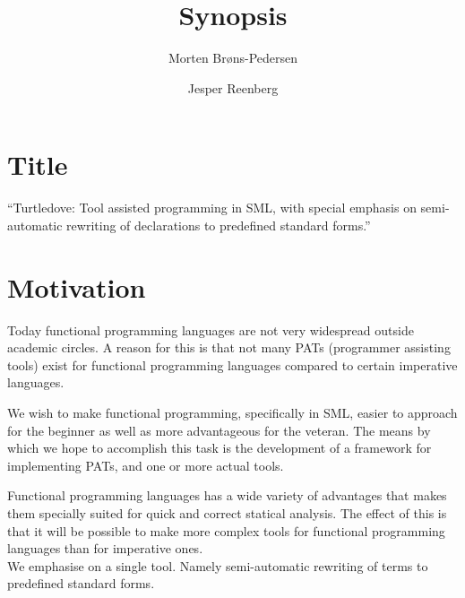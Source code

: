 \documentclass[a4paper,oneside]{memoir}
\author{Morten Brøns-Pedersen \and Jesper Reenberg}
\title{Synopsis}
\begin{document}
\maketitle


\section{Title}
``Turtledove: Tool assisted programming in SML, with special emphasis on semi-automatic rewriting of
declarations to predefined standard forms.''

\section{Motivation}
Today functional programming languages are not very widespread outside academic circles. A reason
for this is that not many PATs (programmer assisting tools) exist for functional programming languages
compared to certain imperative languages.

We wish to make functional programming, specifically in SML, easier to approach for the beginner as
well as more advantageous for the veteran. The means by which we hope to accomplish this task is the
development of a framework for implementing PATs, and one or more actual
tools.

Functional programming languages has a wide variety of advantages that makes them specially suited
for quick and correct statical analysis. The effect of this is that it will be possible to make more
complex tools for functional programming languages than for imperative ones.
\\

We emphasise on a single tool. Namely semi-automatic rewriting of terms to predefined standard
forms. 
\end{document}
